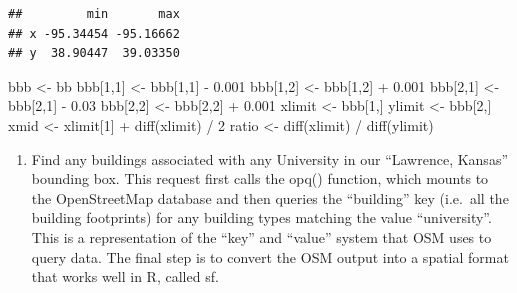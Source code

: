 \documentclass[
  paper=a4,
  ,captions=tableheading
]{scrartcl}
\newenvironment{Shaded}{\begin{snugshade}}{\end{snugshade}}
\newcommand{\DecValTok}[1]{\textcolor[rgb]{0.00,0.00,0.81}{#1}}
\newcommand{\FloatTok}[1]{\textcolor[rgb]{0.00,0.00,0.81}{#1}}
\newcommand{\FunctionTok}[1]{\textcolor[rgb]{0.00,0.00,0.00}{#1}}
\newcommand{\NormalTok}[1]{#1}
\newcommand{\OtherTok}[1]{\textcolor[rgb]{0.56,0.35,0.01}{#1}}
\newcommand{\SpecialCharTok}[1]{\textcolor[rgb]{0.00,0.00,0.00}{#1}}
\providecommand{\tightlist}{%
  \setlength{\itemsep}{0pt}\setlength{\parskip}{0pt}}
\begin{document}
\begin{verbatim}
##         min       max
## x -95.34454 -95.16662
## y  38.90447  39.03350
\end{verbatim}

\begin{Shaded}
\begin{Highlighting}[]
\NormalTok{bbb }\OtherTok{\textless{}{-}}\NormalTok{ bb}
\NormalTok{bbb[}\DecValTok{1}\NormalTok{,}\DecValTok{1}\NormalTok{] }\OtherTok{\textless{}{-}}\NormalTok{ bbb[}\DecValTok{1}\NormalTok{,}\DecValTok{1}\NormalTok{] }\SpecialCharTok{{-}} \FloatTok{0.001}
\NormalTok{bbb[}\DecValTok{1}\NormalTok{,}\DecValTok{2}\NormalTok{] }\OtherTok{\textless{}{-}}\NormalTok{ bbb[}\DecValTok{1}\NormalTok{,}\DecValTok{2}\NormalTok{] }\SpecialCharTok{+} \FloatTok{0.001}
\NormalTok{bbb[}\DecValTok{2}\NormalTok{,}\DecValTok{1}\NormalTok{] }\OtherTok{\textless{}{-}}\NormalTok{ bbb[}\DecValTok{2}\NormalTok{,}\DecValTok{1}\NormalTok{] }\SpecialCharTok{{-}} \FloatTok{0.03}
\NormalTok{bbb[}\DecValTok{2}\NormalTok{,}\DecValTok{2}\NormalTok{] }\OtherTok{\textless{}{-}}\NormalTok{ bbb[}\DecValTok{2}\NormalTok{,}\DecValTok{2}\NormalTok{] }\SpecialCharTok{+} \FloatTok{0.001}
\NormalTok{xlimit }\OtherTok{\textless{}{-}}\NormalTok{ bbb[}\DecValTok{1}\NormalTok{,]}
\NormalTok{ylimit }\OtherTok{\textless{}{-}}\NormalTok{ bbb[}\DecValTok{2}\NormalTok{,] }
\NormalTok{xmid }\OtherTok{\textless{}{-}}\NormalTok{ xlimit[}\DecValTok{1}\NormalTok{] }\SpecialCharTok{+} \FunctionTok{diff}\NormalTok{(xlimit) }\SpecialCharTok{/} \DecValTok{2} 
\NormalTok{ratio }\OtherTok{\textless{}{-}} \FunctionTok{diff}\NormalTok{(xlimit) }\SpecialCharTok{/} \FunctionTok{diff}\NormalTok{(ylimit)}
\end{Highlighting}
\end{Shaded}

\begin{enumerate}
\def\labelenumi{\arabic{enumi}.}
\setcounter{enumi}{1}
\tightlist
\item
  Find any buildings associated with any University in our ``Lawrence,
  Kansas'' bounding box. This request first calls the opq() function,
  which mounts to the OpenStreetMap database and then queries the
  ``building'' key (i.e.~all the building footprints) for any building
  types matching the value ``university''. This is a representation of
  the ``key'' and ``value'' system that OSM uses to query data. The
  final step is to convert the OSM output into a spatial format that
  works well in R, called sf.
\end{enumerate}
\end{document}
